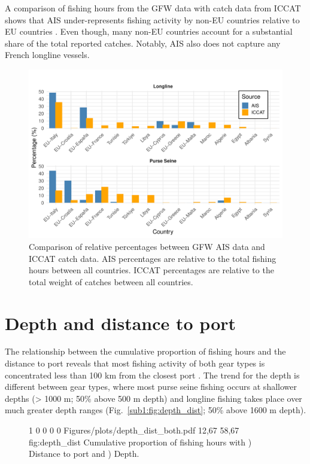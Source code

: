 A comparison of fishing hours from the GFW data with catch data from ICCAT shows that AIS
under-represents fishing activity by non-EU countries relative to EU countries
. Even though, many non-EU countries account for a substantial share of the
total reported catches. Notably, AIS also does not capture any French longline vessels.

\begin{figure}[ht]
	\centering
	\includegraphics[width=1\linewidth, trim=0 0 0 1cm,clip]{Figures/plots/ais_vs_iccat.pdf}
	\caption{Comparison of relative percentages between GFW AIS data and ICCAT catch data. AIS percentages are relative to the
		total fishing hours between all countries. ICCAT percentages are relative to the total weight of catches between all countries.}
	\label{fig:ais_iccat}
\end{figure}

\FloatBarrier
\section{Depth and distance to port}

The relationship between the cumulative proportion of fishing hours and the distance to port
reveals that most fishing activity of both gear types is concentrated less than 100 km from the
closest port . The trend for the depth is different between gear types,
where most purse seine fishing occurs at shallower depths (> 1000 m; 50\% above 500 m depth) and
longline fishing takes place over much greater depth ranges (Fig.~\ref{sub1:fig:depth_dist}; 50\%
above 1600 m depth).

\begin{figure}[ht]
	{1\linewidth}                           %
	{0 0 0 0}                       %
	{Figures/plots/depth_dist_both.pdf} %
	{12,67}                                  %
	{58,67}                                  %
	{fig:depth_dist}
	{%
		Cumulative proportion of fishing hours with ) Distance to port and ) Depth.}
\end{figure}
